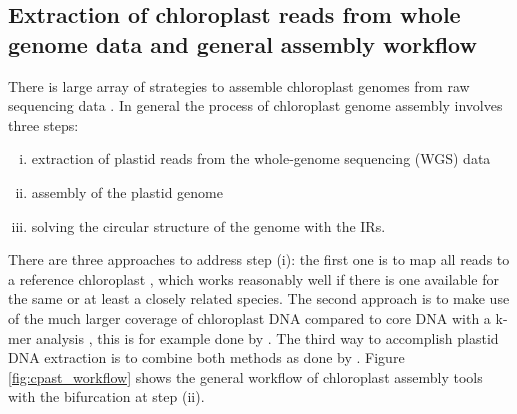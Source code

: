 \subsection{Extraction of chloroplast reads from whole genome data and general assembly workflow}
There is large array of strategies to assemble chloroplast genomes from raw sequencing
data \cite{twyford_strategies_2017}. In general the process of chloroplast genome assembly
involves three steps:
\begin{enumerate}[(i)]
\item extraction of plastid reads from the whole-genome sequencing (WGS) data
\item assembly of the plastid genome
\item solving the circular structure of
the genome with the IRs.
\end{enumerate}
There are three approaches to address step (i): the first one is to map all reads to a
reference chloroplast \cite{Vinga2012}, which works reasonably well if there is one
available for the same or at least a closely related species. The second approach is to
make use of the much larger coverage of chloroplast DNA compared to core DNA with a k-mer
analysis \cite{Chan2013}, this is for example done by \ce \hspace{0.25ex}
\cite{j_ankenbrand_chloroextractor:_2018}. The third way to accomplish plastid DNA
extraction is to combine both methods as done by \np \hspace{0.25ex}
\cite{dierckxsens_novoplasty:_2017}. Figure \ref{fig:cpast_workflow} shows the general
workflow of chloroplast assembly tools with the bifurcation at step (ii).

